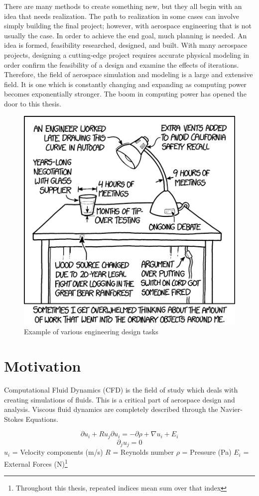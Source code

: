 

There are many methods to create something new, but they all begin with an idea that needs realization. The path to realization in some cases can involve simply building the final project; however, with aerospace engineering that is not usually the case. In order to achieve the end goal, much planning is needed. An idea is formed, feasibility researched, designed, and built. With many aerospace projects, designing a cutting-edge project requires accurate physical modeling in order confirm the feasibility of a design and examine the effects of iterations. Therefore, the field of aerospace simulation and modeling is a large and extensive field. It is one which is constantly changing and expanding as computing power becomes exponentially stronger. The boom in computing power has opened the door to this thesis. \par

\begin{figure}[ht]
    \includegraphics[width=.45\textwidth]{figures/work.png}
    \centering
    \caption[Example of various engineering design tasks]{Example of various engineering design tasks \cite{xkcd}}
    \label{fig:xkcd}
\end{figure}


\section{Motivation}





\indent Computational Fluid Dynamics (CFD) is the field of study which deals with creating simulations of fluids. This is a critical part of aerospace design and analysis. Viscous fluid dynamics are completely described through the Navier-Stokes Equations.

\begin{equation}
    \label{eqn:navier_1}
    \partial u_i + R u_j \partial u_i = -\partial \rho + \nabla u_i + E_i 
\end{equation}
\begin{equation}
    \label{eqn:navier_2}
        \partial_j u_j = 0  
\end{equation}
\(u_i\) = Velocity components (m/s) \newline
\(R\) = Reynolds number \newline
\(\rho\) = Pressure (Pa) \newline
\(E_i\) = External Forces (N)\footnote{Throughout this thesis, repeated indices mean sum over that index} \par



